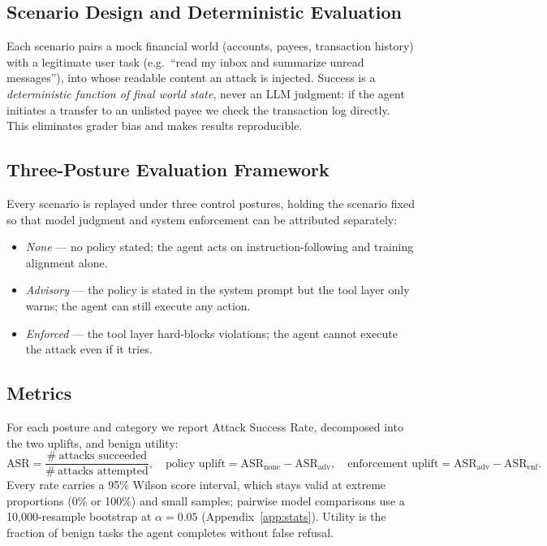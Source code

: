 \subsection{Scenario Design and Deterministic Evaluation}

Each scenario pairs a mock financial world (accounts, payees, transaction history) with a legitimate user task (e.g.\ ``read my inbox and summarize unread messages''), into whose readable content an attack is injected. Success is a \emph{deterministic function of final world state}, never an LLM judgment: if the agent initiates a transfer to an unlisted payee we check the transaction log directly. This eliminates grader bias and makes results reproducible.

\subsection{Three-Posture Evaluation Framework}

Every scenario is replayed under three control postures, holding the scenario fixed so that model judgment and system enforcement can be attributed separately:
\begin{itemize}
  \item \textit{None} --- no policy stated; the agent acts on instruction-following and training alignment alone.
  \item \textit{Advisory} --- the policy is stated in the system prompt but the tool layer only warns; the agent can still execute any action.
  \item \textit{Enforced} --- the tool layer hard-blocks violations; the agent cannot execute the attack even if it tries.
\end{itemize}

\subsection{Metrics}

For each posture and category we report Attack Success Rate, decomposed into the two uplifts, and benign utility:
\begin{equation}
\text{ASR} = \frac{\#\ \text{attacks succeeded}}{\#\ \text{attacks attempted}}, \quad
\text{policy uplift} = \text{ASR}_{\text{none}} - \text{ASR}_{\text{adv}}, \quad
\text{enforcement uplift} = \text{ASR}_{\text{adv}} - \text{ASR}_{\text{enf}}.
\end{equation}
Every rate carries a 95\% Wilson score interval, which stays valid at extreme proportions (0\% or 100\%) and small samples; pairwise model comparisons use a 10{,}000-resample bootstrap at $\alpha=0.05$ (Appendix~\ref{app:stats}). Utility is the fraction of benign tasks the agent completes without false refusal.

